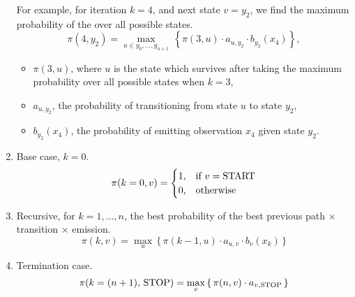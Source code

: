 \documentclass[9pt,twocolumn]{article}
\newcommand{\START}{\text{\lstinline{START}}}
\newcommand{\STOP}{\text{\lstinline{STOP}}}
\begin{document}
\begin{enumerate}
                For example, for iteration $k=4$, and next state $v=y_2$, we find the maximum probability of the over all possible states.
                \begin{equation}
                    \pi(4,y_2) = \max_{u \in y_0, \ldots, y_{n+1}}\, \left\{ \pi(3,u)\cdot a_{u,y_2} \cdot b_{y_2}(x_4) \right\},
                \end{equation}

                \begin{itemize}
                    \item $\pi(3,u)$, where $u$ is the state which survives after taking the maximum probability over all possible states when $k=3$,
                    \item $a_{u,y_2}$, the probability of transitioning from state $u$ to state $y_2$,
                    \item $b_{y_2}(x_4)$, the probability of emitting observation $x_4$ given state $y_2$.
                \end{itemize}
                
            \item
                Base case, $k = 0$.
                \begin{equation}
                \pi(k=0,v) = 
                \begin{cases}
                  1, & \text{if}\ v=\START \\
                  0, & \text{otherwise}
                \end{cases}
                \end{equation}
                
            \item
                Recursive, for $k = 1, \ldots, n$, the best probability of the best previous path $\times$ transition $\times$ emission.
                \begin{equation}
                    \pi(k,v) = \max_u\,\{\,{\pi(k-1, u) \cdot a_{u,v} \cdot b_v(x_k)}\,\}
                \end{equation}

            \item
                Termination case.
                \begin{equation}
                    \pi(k=(n+1),\,\STOP) = \max_v\,\{\,\pi(n,v) \cdot a_{v, \STOP}\,\}
                \end{equation}
            \end{enumerate}
\end{document}
